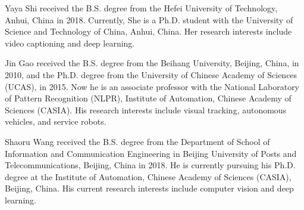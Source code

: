 \documentclass[journal]{IEEEtran}
\begin{document}
\begin{IEEEbiography}
  {Yaya Shi}
  received the B.S. degree from the Hefei University of Technology, Anhui, China in 2018. Currently, She is a Ph.D. student with the University of Science and Technology of China, Anhui, China. Her research interests include video captioning and deep learning.
\end{IEEEbiography}
\vspace{-5mm}

\begin{IEEEbiography}
{Jin Gao}
received the B.S. degree from the Beihang University, Beijing, China, in 2010, and the Ph.D. degree from the University of Chinese Academy of Sciences (UCAS), in 2015. Now he is an associate professor with the National Laboratory of Pattern Recognition (NLPR), Institute of Automation, Chinese Academy of Sciences (CASIA). His research interests include visual tracking, autonomous vehicles, and service robots.
\end{IEEEbiography}
\vspace{-5mm}

\begin{IEEEbiography}
{Shaoru Wang}
received the B.S. degree from the Department of School of Information and Communication Engineering in Beijing University of Posts and Telecommunications, Beijing, China in 2018. He is currently pursuing his Ph.D. degree at the Institute of Automation, Chinese Academy of Sciences (CASIA), Beijing, China. His current research interests include computer vision and deep learning.
\end{IEEEbiography}
\vspace{-5mm}
\end{document}
